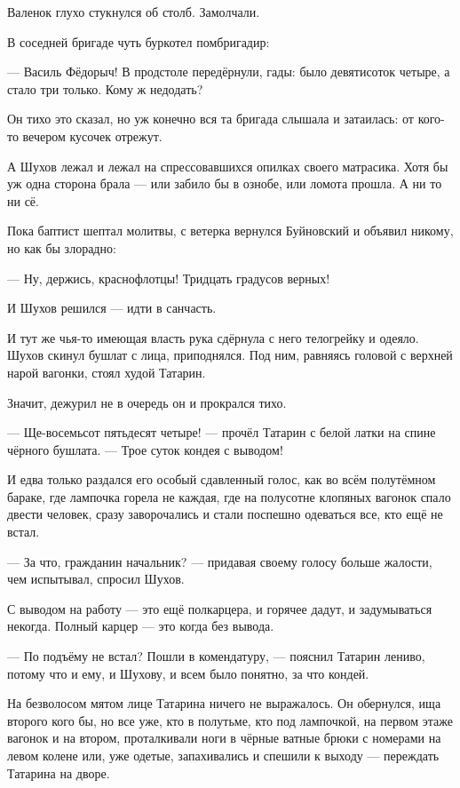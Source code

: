 Валенок глухо стукнулся об столб. Замолчали.

В соседней бригаде чуть буркотел помбригадир:

--- Василь Фёдорыч! В продстоле передёрнули, гады: было девятисоток четыре, а стало три только. 
Кому ж недодать?

Он тихо это сказал, но уж конечно вся та бригада слышала и затаилась: от кого-то вечером 
кусочек отрежут.

А Шухов лежал и лежал на спрессовавшихся опилках своего матрасика. Хотя бы уж одна сторона 
брала --- или забило бы в ознобе, или ломота прошла. А ни то ни сё.

Пока баптист шептал молитвы, с ветерка вернулся Буйновский и объявил никому, но как бы 
злорадно:

--- Ну, держись, краснофлотцы! Тридцать градусов верных!

И Шухов решился --- идти в санчасть.

И тут же чья-то имеющая власть рука сдёрнула с него телогрейку и одеяло. Шухов скинул бушлат 
с лица, приподнялся. Под ним, равняясь головой с верхней нарой вагонки, стоял худой Татарин.

Значит, дежурил не в очередь он и прокрался тихо.

--- Ще-восемьсот пятьдесят четыре! --- прочёл Татарин с белой латки на спине чёрного бушлата. --- 
Трое суток кондея с выводом!

И едва только раздался его особый сдавленный голос, как во всём полутёмном бараке, где 
лампочка горела не каждая, где на полусотне клопяных вагонок спало двести человек, сразу 
заворочались и стали поспешно одеваться все, кто ещё не встал.

--- За что, гражданин начальник? --- придавая своему голосу больше жалости, чем испытывал, 
спросил Шухов.

С выводом на работу --- это ещё полкарцера, и горячее дадут, и задумываться некогда. Полный 
карцер --- это когда без вывода.

--- По подъёму не встал? Пошли в комендатуру, --- пояснил Татарин лениво, потому что и ему, и 
Шухову, и всем было понятно, за что кондей.

На безволосом мятом лице Татарина ничего не выражалось. Он обернулся, ища второго кого бы, но 
все уже, кто в полутьме, кто под лампочкой, на первом этаже вагонок и на втором, проталкивали 
ноги в чёрные ватные брюки с номерами на левом колене или, уже одетые, запахивались и спешили 
к выходу --- переждать Татарина на дворе.

